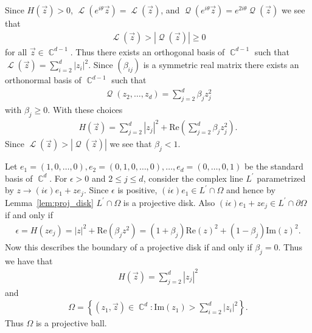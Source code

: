 \documentclass[12pt]{amsart}
\theoremstyle{plain}
\theoremstyle{definition}
\theoremstyle{remark}
\begin{document}
Since $H(\vec{z}) > 0$, $\operatorname{\mathcal{L}}(e^{i\theta}\vec{z}) = \operatorname{\mathcal{L}}(\vec{z})$, and $\operatorname{\mathcal{Q}}(e^{i\theta}\vec{z}) = e^{2i\theta}\operatorname{\mathcal{Q}}(\vec{z})$ we see that 
\begin{align*}
\operatorname{\mathcal{L}}(\vec{z}) > {\left|{\operatorname{\mathcal{Q}}(\vec{z})}\right|} \geq 0
\end{align*}
for all $\vec{z} \in \operatorname{\mathbb{C}}^{d-1}$. Thus there exists an orthogonal basis of $\operatorname{\mathbb{C}}^{d-1}$ such that $\operatorname{\mathcal{L}}(\vec{z}) = \sum_{i=2}^d {\left|{z_i}\right|}^2$. Since $(\beta_{ij})$ is a symmetric real matrix there exists an orthonormal basis of $\operatorname{\mathbb{C}}^{d-1}$ such that
\begin{align*}
\operatorname{\mathcal{Q}}(z_2, \dots, z_d) = \sum_{j=2}^d \beta_{j} z_j^2
\end{align*}
with $\beta_j \geq 0$. With these choices
\begin{align*}
H(\vec{z}) = \sum_{j=2}^d {\left|{z_j}\right|}^2 + \textrm{Re}\left( \sum_{j=2}^d \beta_j z_j^2\right).
\end{align*}
Since $\operatorname{\mathcal{L}}(\vec{z}) > {\left|{\operatorname{\mathcal{Q}}(\vec{z})}\right|}$ we see that $\beta_j < 1$. 

Let $e_1 = (1,0,\dots,0), e_2=(0,1,0,\dots, 0), \dots, e_d = (0,\dots,0,1)$ be the standard basis of $\operatorname{\mathbb{C}}^d$. For $\epsilon >0$ and $2 \leq j \leq d$, consider the complex line $L^\prime$ parametrized by $z \rightarrow (i\epsilon) e_1 + ze_j$. Since $\epsilon$ is positive,  $(i\epsilon) e_1 \in L^\prime \cap \Omega$  and hence by Lemma~\ref{lem:proj_disk} $L^\prime \cap \Omega$ is a projective disk. Also $(i\epsilon) e_1 + ze_j \in L^\prime \cap \partial \Omega$ if and only if 
\begin{align*}
\epsilon = H(ze_j) = {\left|{z}\right|}^2 + \textrm{Re}(\beta_j z^2) =  (1 + \beta_j) \textrm{Re}(z)^2 + (1-\beta_j) \textrm{Im}(z)^2.
\end{align*}
Now this describes the boundary of a projective disk if and only if $\beta_j = 0$. Thus we have that 
\begin{align*}
H(\vec{z}) = \sum_{j=2}^d {\left|{z_j}\right|}^2
\end{align*}
and
\begin{align*}
\Omega = \left\{ (z_1,\vec{z}) \in \operatorname{\mathbb{C}}^d: \text{Im}(z_1) > \sum_{i=2}^{d} {\left|{z_i}\right|}^2 \right\}.
\end{align*}
Thus $\Omega$ is a projective ball.


 
\end{document}
